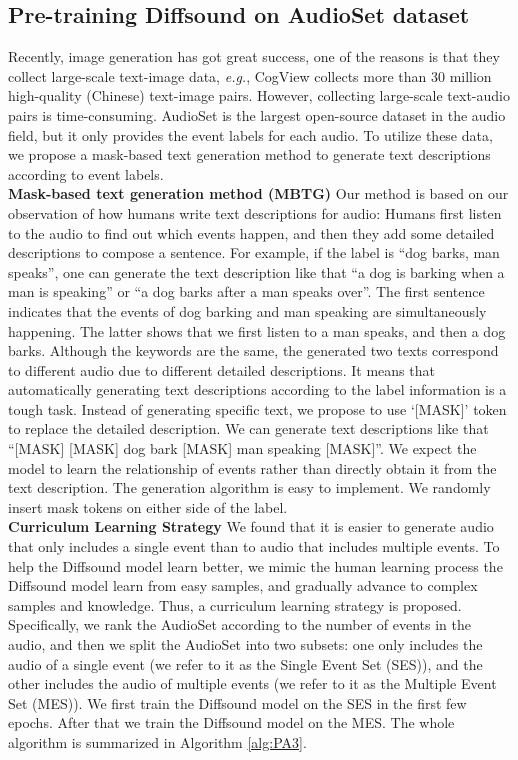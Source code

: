 \documentclass[lettersize,journal]{IEEEtran}
\begin{document}
\subsection{Pre-training Diffsound on AudioSet dataset} 
Recently, image generation has got great success, one of the reasons is that they collect large-scale text-image data, \textit{e.g.}, CogView \cite{ding2021cogview} collects more than 30 million high-quality (Chinese) text-image pairs. However, collecting large-scale text-audio pairs is time-consuming. AudioSet \cite{gemmeke2017audio} is the largest open-source dataset in the audio field, but it only provides the event labels for each audio. To utilize these data, we propose a mask-based text generation method to generate text descriptions according to event labels. \\
\textbf{Mask-based text generation method (MBTG)}
Our method is based on our observation of how humans write text descriptions for audio: Humans first listen to the audio to find out which events happen, and then they add some detailed descriptions to compose a sentence. For example, if the label is ``dog barks, man speaks'', one can generate the text description like that ``a dog is barking when a man is speaking'' or ``a dog barks after a man speaks over''. The first sentence indicates that the events of dog barking and man speaking are simultaneously happening. The latter shows that we first listen to a man speaks, and then a dog barks. Although the keywords are the same, the generated two texts correspond to different audio due to different detailed descriptions. It means that automatically generating text descriptions according to the label information is a tough task. Instead of generating specific text, we propose to use `[MASK]' token to replace the detailed description. We can generate text descriptions like that ``[MASK] [MASK] dog bark [MASK] man speaking [MASK]''. We expect the model to learn the relationship of events rather than directly obtain it from the text description. The generation algorithm is easy to implement. We randomly insert  mask tokens on either side of the label. \\
\noindent\textbf{Curriculum Learning Strategy}
We found that it is easier to generate audio that only includes a single event than to audio that includes multiple events. To help the Diffsound model learn better, we mimic the human learning process {\color{black}{by letting}} the Diffsound model learn from easy samples, and gradually advance to complex samples and knowledge. Thus, a curriculum learning \cite{bengio2009curriculum} strategy is proposed. Specifically, we rank the AudioSet according to the number of events in the audio, and then we split the AudioSet into two subsets: one only includes the audio of a single event (we refer to it as the Single Event Set (SES)), and the other includes the audio of multiple events (we refer to it as the Multiple Event Set (MES)). We first train the Diffsound model on the SES in the first few epochs. After that we train the Diffsound model on the MES. The whole algorithm is summarized in Algorithm \ref{alg:PA3}.  
\end{document}

